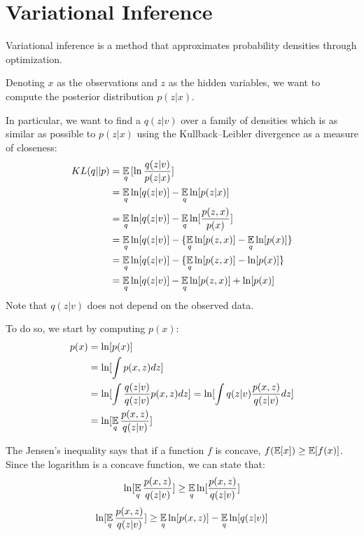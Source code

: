 \chapter{Variational Inference} \label{vi}
Variational inference is a method that approximates probability densities through optimization.

Denoting $x$ as the observations and $z$ as the hidden variables,
we want to compute the posterior distribution $p(z | x)$.

In particular, we want to find a $q(z | v)$ over a family of densities
which is as similar as possible to $p(z | x)$ using the Kullback–Leibler divergence as a measure of closeness:
\begin{equation} \label{eq:klexpanded}
    \begin{split}
        KL(q || p) & = \operatorname*{\mathbb{E}}_q {[\ln \frac{q(z | v)}{p(z | x)}]} \\
        & = \operatorname*{\mathbb{E}}_q \ln [q(z | v)] - \operatorname*{\mathbb{E}}_q \ln [p(z | x)] \\
        & = \operatorname*{\mathbb{E}}_q \ln [q(z | v)] - \operatorname*{\mathbb{E}}_q \ln [\frac{p(z,x)}{p(x)}] \\
        & = \operatorname*{\mathbb{E}}_q \ln [q(z | v)] - \{ \operatorname*{\mathbb{E}}_q \ln [p(z,x)] - \operatorname*{\mathbb{E}}_q \ln [p(x)] \} \\
        & = \operatorname*{\mathbb{E}}_q \ln [q(z | v)] - \{ \operatorname*{\mathbb{E}}_q \ln [p(z,x)] - \ln [p(x)] \} \\
        & = \operatorname*{\mathbb{E}}_q \ln [q(z | v)] - \operatorname*{\mathbb{E}}_q \ln [p(z,x)] + \ln [p(x)]
    \end{split}
\end{equation}
Note that $q(z | v)$ does not depend on the observed data.

To do so, we start by computing $p(x)$:
\begin{equation*}
    \begin{split}
        p(x) & = \ln[p(x)] \\
        & = \ln[\int p(x,z) dz]  \\
        & = \ln[\int \frac{q(z | v)}{q(z | v)} p(x,z) dz] = \ln[\int q(z | v) \frac{p(x,z)}{q(z | v)} dz] \\
        & = \ln[\operatorname*{\mathbb{E}}_q \frac{p(x,z)}{q(z | v)}]
    \end{split}
\end{equation*}

The Jensen's inequality says that if a function $f$ is concave, $f(\operatorname*{\mathbb{E}}[x]) \geq \operatorname*{\mathbb{E}}[f(x)]$.
Since the logarithm is a concave function, we can state that:
\[ \ln[\operatorname*{\mathbb{E}}_q \frac{p(x,z)}{q(z | v)}] \geq \operatorname*{\mathbb{E}}_q \ln[\frac{p(x,z)}{q(z | v)}] \]
\[ \ln[\operatorname*{\mathbb{E}}_q \frac{p(x,z)}{q(z | v)}] \geq \operatorname*{\mathbb{E}}_q \ln[p(x,z)] - \operatorname*{\mathbb{E}}_q \ln[q(z | v)] \]

